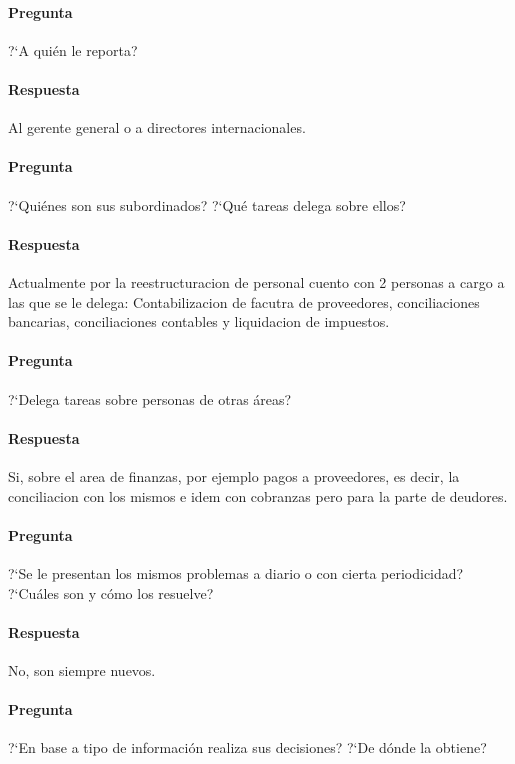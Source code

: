 \documentclass[12pt,a4paper,spanish]{article}
\begin{document}
	\paragraph{Pregunta}
	 ?`A qui\'en le reporta?
	\paragraph{Respuesta}
Al gerente general o a directores internacionales.

	\paragraph{Pregunta}
	 ?`Qui\'enes son sus subordinados?  ?`Qu\'e tareas delega sobre ellos?
	\paragraph{Respuesta}
Actualmente por la reestructuracion de personal cuento con 2 personas a cargo a las que se le delega: Contabilizacion de facutra de proveedores, conciliaciones bancarias, conciliaciones contables y liquidacion de impuestos.

	\paragraph{Pregunta}
	 ?`Delega tareas sobre personas de otras \'areas?
	\paragraph{Respuesta}
Si, sobre el area de finanzas, por ejemplo pagos a proveedores, es decir, la conciliacion con los mismos e idem con cobranzas pero para la parte de deudores.

	\paragraph{Pregunta}
	 ?`Se le presentan los mismos problemas a diario o con cierta periodicidad?  ?`Cu\'ales son y c\'omo los resuelve?
	\paragraph{Respuesta}
No, son siempre nuevos.

	\paragraph{Pregunta}
	 ?`En base a tipo de informaci\'on realiza sus decisiones?  ?`De d\'onde la obtiene?
\end{document}
